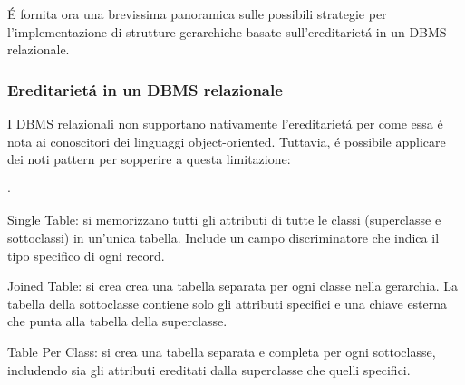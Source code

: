 É fornita ora una brevissima panoramica sulle possibili strategie per
l'implementazione di strutture gerarchiche basate sull'ereditarietá in un
DBMS relazionale.
\subsubsection{Ereditarietá in un DBMS relazionale}
I DBMS relazionali non supportano nativamente l'ereditarietá per come essa é nota
ai conoscitori dei linguaggi object-oriented. Tuttavia, é possibile applicare dei
noti pattern per sopperire a questa limitazione:
\begin{list}{$\cdot$}{}
    \item Single Table: si memorizzano tutti gli attributi di tutte le 
    classi (superclasse e sottoclassi) in un'unica tabella. Include un campo discriminatore 
    che indica il tipo specifico di ogni record.
    \item Joined Table: si crea crea una tabella separata per ogni classe nella gerarchia. 
    La tabella della sottoclasse contiene solo gli attributi specifici e una chiave esterna 
    che punta alla tabella della superclasse.
    \item Table Per Class: si crea una tabella separata e completa per ogni sottoclasse, 
    includendo sia gli attributi ereditati dalla superclasse che quelli specifici.
\end{list}

